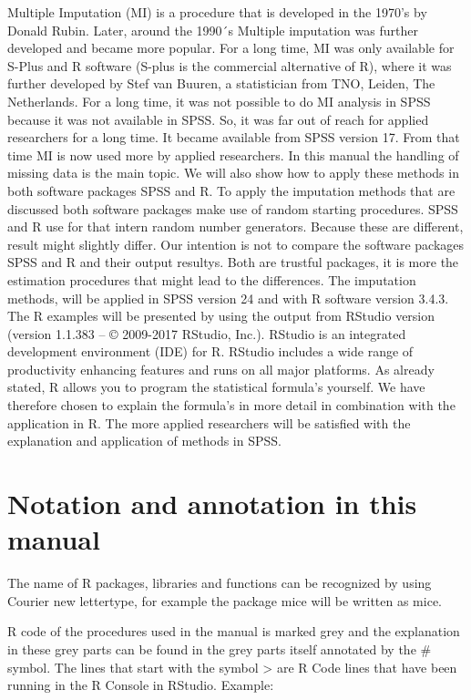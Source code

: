 \documentclass[]{book}
\theoremstyle{definition}
\theoremstyle{definition}
\theoremstyle{definition}
\theoremstyle{remark}
\begin{document}
Multiple Imputation (MI) is a procedure that is developed in the 1970's
by Donald Rubin. Later, around the 1990´s Multiple imputation was
further developed and became more popular. For a long time, MI was only
available for S-Plus and R software (S-plus is the commercial
alternative of R), where it was further developed by Stef van Buuren, a
statistician from TNO, Leiden, The Netherlands. For a long time, it was
not possible to do MI analysis in SPSS because it was not available in
SPSS. So, it was far out of reach for applied researchers for a long
time. It became available from SPSS version 17. From that time MI is now
used more by applied researchers. In this manual the handling of missing
data is the main topic. We will also show how to apply these methods in
both software packages SPSS and R. To apply the imputation methods that
are discussed both software packages make use of random starting
procedures. SPSS and R use for that intern random number generators.
Because these are different, result might slightly differ. Our intention
is not to compare the software packages SPSS and R and their output
resultys. Both are trustful packages, it is more the estimation
procedures that might lead to the differences. The imputation methods,
will be applied in SPSS version 24 and with R software version 3.4.3.
The R examples will be presented by using the output from RStudio
version (version 1.1.383 -- © 2009-2017 RStudio, Inc.). RStudio is an
integrated development environment (IDE) for R. RStudio includes a wide
range of productivity enhancing features and runs on all major
platforms. As already stated, R allows you to program the statistical
formula's yourself. We have therefore chosen to explain the formula's in
more detail in combination with the application in R. The more applied
researchers will be satisfied with the explanation and application of
methods in SPSS.

\section{Notation and annotation in this
manual}\label{notation-and-annotation-in-this-manual}

The name of R packages, libraries and functions can be recognized by
using Courier new lettertype, for example the package mice will be
written as mice.

R code of the procedures used in the manual is marked grey and the
explanation in these grey parts can be found in the grey parts itself
annotated by the \# symbol. The lines that start with the symbol
\textgreater{} are R Code lines that have been running in the R Console
in RStudio. Example:
\end{document}
